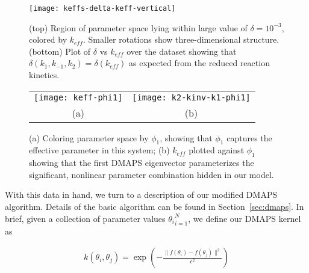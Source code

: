 \begin{figure}[ht!]
  \centering
  \texttt{[image: keffs-delta-keff-vertical]}
  \caption[Quantitative three-dimensional views of level sets of the
  effective parameter in a model of chemical kinetics]{(top) Region of
    parameter space lying within large value of $\delta = 10^{-3}$,
    colored by $k_{eff}$. Smaller rotations show three-dimensional
    structure. (bottom) Plot of $\delta$ vs $k_{eff}$ over the dataset
    showing that $\delta(k_1, k_{-1}, k_2) = \delta(k_{eff})$ as
    expected from the reduced reaction kinetics. \label{fig:abc-keff}}
\end{figure}


\begin{figure}[!htp]
  \centering
  \begin{tabular}{cc}
    \texttt{[image: keff-phi1]} &
                                                        \texttt{[image: k2-kinv-k1-phi1]}\\
    (a) & (b)
  \end{tabular}
  \caption[DMAPS results for simple kinetic model]{(a) Coloring parameter space by $\phi_1$, showing that
    $\phi_1$ captures the effective parameter in this system; (b)
    $k_{eff}$ plotted against $\phi_1$ showing that the first DMAPS
    eigenvector parameterizes the significant, nonlinear parameter
    combination hidden in our model. \label{fig:abc-dmaps}}
\end{figure}


With this data in hand, we turn to a description of our modified
DMAPS algorithm. Details of the basic algorithm can be found in
Section~\ref{sec:dmaps}. In brief, given a collection of parameter
values ${\theta_i}_{i=1}^N$, we define our DMAPS kernel as

\begin{align}
  k(\theta_i, \theta_j) = \exp \left(-\frac{\|f(\theta_i) -
  f(\theta_j)\|^2}{\epsilon^2} \right)
  \label{eq:dmaps-mm}
\end{align}

